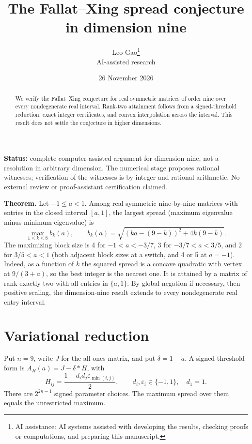 \documentclass[11pt]{article}
\title{\textcolor{ink}{The Fallat--Xing spread conjecture in dimension nine}}
\author{Leo Gao\thanks{AI assistance: AI systems assisted with developing the results, checking proofs or computations, and preparing this manuscript.}\\[3pt]\small\textsf{AI-assisted research}}
\date{26 November 2026}
\begin{document}
\maketitle
\begin{abstract}
We verify the Fallat–Xing conjecture for real symmetric matrices of order nine over every nondegenerate real interval. Rank-two attainment follows from a signed-threshold reduction, exact integer certificates, and convex interpolation across the interval. This result does not settle the conjecture in higher dimensions.
\end{abstract}
\textbf{Status:} complete computer-assisted argument for dimension nine, not a resolution in arbitrary dimension. The numerical stage proposes rational witnesses; verification of the witnesses is by integer and rational arithmetic. No external review or proof-assistant certification claimed.

\textbf{Theorem.} Let \(-1 \le  a < 1\). Among real symmetric nine-by-nine matrices with entries in the closed interval \([a,1]\), the largest spread (maximum eigenvalue minus minimum eigenvalue) is
\[
\max_{1\le k\le 8} b_k(a),\qquad b_k(a)=\sqrt{(ka-(9-k))^2+4k(9-k)}.
\]
The maximizing block size is 4 for \(-1<a<-3/7\), 3 for \(-3/7<a<3/5\), and 2 for \(3/5<a<1\) (both adjacent block sizes at a switch, and 4 or 5 at \(a=-1\)). Indeed, as a function of \(k\) the squared spread is a concave quadratic with vertex at \(9/(3+a)\), so the best integer is the nearest one. It is attained by a matrix of rank exactly two with all entries in \(\{a,1\}\). By global negation if necessary, then positive scaling, the dimension-nine result extends to every nondegenerate real entry interval.

\section{Variational reduction}\label{variational-reduction}

Put \(n=9\), write \(J\) for the all-ones matrix, and put \(\delta =1-a\). A signed-threshold form is \(A_H(a)=J-\delta *H\), with
\[
H_{ij}=\frac{1-d_i d_j\varepsilon_{\min(i,j)}}2,\qquad d_i,\varepsilon_i\in\{-1,1\},\quad d_1=1.
\]
There are \(2^{2n-1}\) signed parameter choices. The maximum spread over them equals the unrestricted maximum.
\end{document}
